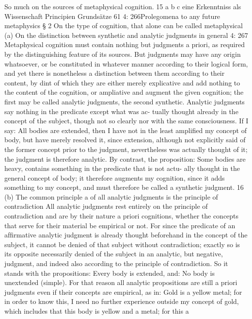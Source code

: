 So much on the sources of metaphysical cognition. 15
a
b
c
eine Erkenntniss als Wissenschaft
Principien
Grundsätze
61
4: 266Prolegomena to any future metaphysics
§ 2
On the type of cognition,
that alone can be called metaphysical
(a) On the distinction between synthetic and analytic
judgments in general
4: 267
Metaphysical cognition must contain nothing but judgments a priori,
as required by the distinguishing feature of its sources. But judgments
may have any origin whatsoever, or be constituted in whatever manner
according to their logical form, and yet there is nonetheless a distinction
between them according to their content, by dint of which they are
either merely explicative and add nothing to the content of the cognition,
or ampliative and augment the given cognition; the ﬁrst may be called
analytic judgments, the second synthetic.
Analytic judgments say nothing in the predicate except what was ac-
tually thought already in the concept of the subject, though not so clearly
nor with the same consciousness. If I say: All bodies are extended, then
I have not in the least ampliﬁed my concept of body, but have merely
resolved it, since extension, although not explicitly said of the former
concept prior to the judgment, nevertheless was actually thought of it;
the judgment is therefore analytic. By contrast, the proposition: Some
bodies are heavy, contains something in the predicate that is not actu-
ally thought in the general concept of body; it therefore augments my
cognition, since it adds something to my concept, and must therefore be
called a synthetic judgment. 16
(b) The common principle a of all analytic judgments
is the principle of contradiction
All analytic judgments rest entirely on the principle of contradiction
and are by their nature a priori cognitions, whether the concepts that
serve for their material be empirical or not. For since the predicate
of an afﬁrmative analytic judgment is already thought beforehand in
the concept of the subject, it cannot be denied of that subject without
contradiction; exactly so is its opposite necessarily denied of the subject
in an analytic, but negative, judgment, and indeed also according to the
principle of contradiction. So it stands with the propositions: Every body
is extended, and: No body is unextended (simple).
For that reason all analytic propositions are still a priori judgments
even if their concepts are empirical, as in: Gold is a yellow metal; for
in order to know this, I need no further experience outside my concept
of gold, which includes that this body is yellow and a metal; for this
a
